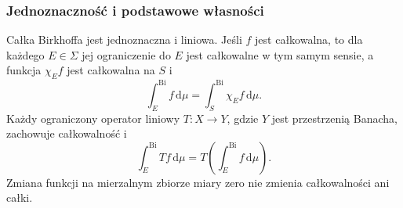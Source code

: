 \subsubsection{Jednoznaczność i podstawowe własności}

\begin{twierdzenie}
\label{thm:birkhoff-basic15b}
Całka Birkhoffa jest jednoznaczna i liniowa.
Jeśli $f$ jest całkowalna, to dla każdego $E\in\Sigma$
jej ograniczenie do $E$ jest całkowalne w tym samym sensie,
a funkcja $\chi_E f$ jest całkowalna na $S$ i
\[
 \int_E^{\mathrm{Bi}}f\,\mathrm d\mu
 =\int_S^{\mathrm{Bi}}\chi_E f\,\mathrm d\mu.
\]
Każdy ograniczony operator liniowy $T:X\to Y$, gdzie $Y$
jest przestrzenią Banacha, zachowuje całkowalność i
\[
 \int_E^{\mathrm{Bi}} Tf\,\mathrm d\mu
 =T\left(\int_E^{\mathrm{Bi}} f\,\mathrm d\mu\right).
\]
Zmiana funkcji na mierzalnym zbiorze miary zero
nie zmienia całkowalności ani całki.
\end{twierdzenie}
